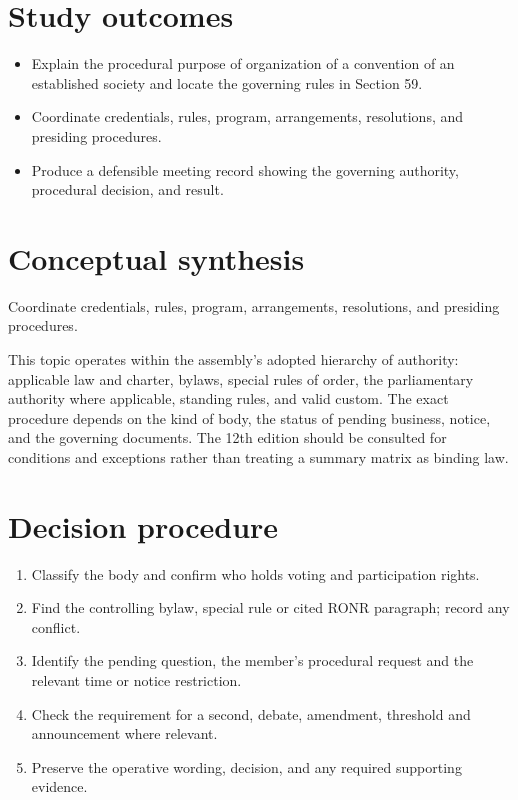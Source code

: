 \documentclass[11pt]{article}
\begin{document}
\SuiteOpen
{}
\section{Study outcomes}
\begin{itemize}[leftmargin=*,itemsep=4pt]
\item Explain the procedural purpose of organization of a convention of an established society and locate the governing rules in Section 59.
\item Coordinate credentials, rules, program, arrangements, resolutions, and presiding procedures.
\item Produce a defensible meeting record showing the governing authority, procedural decision, and result.
\end{itemize}

\section{Conceptual synthesis}
Coordinate credentials, rules, program, arrangements, resolutions, and presiding procedures.

This topic operates within the assembly’s adopted hierarchy of authority: applicable law and charter, bylaws, special rules of order, the parliamentary authority where applicable, standing rules, and valid custom. The exact procedure depends on the kind of body, the status of pending business, notice, and the governing documents. The 12th edition should be consulted for conditions and exceptions rather than treating a summary matrix as binding law.
\section{Decision procedure}
\begin{enumerate}[leftmargin=*,itemsep=4pt]
\item Classify the body and confirm who holds voting and participation rights.
\item Find the controlling bylaw, special rule or cited RONR paragraph; record any conflict.
\item Identify the pending question, the member’s procedural request and the relevant time or notice restriction.
\item Check the requirement for a second, debate, amendment, threshold and announcement where relevant.
\item Preserve the operative wording, decision, and any required supporting evidence.
\end{enumerate}
\end{document}
